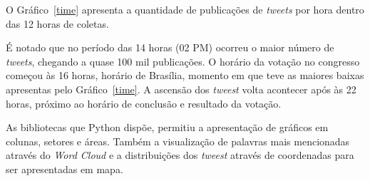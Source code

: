 O Gráfico~\ref{time} apresenta a quantidade de publicações de \textit{tweets} por hora dentro das 12 horas de coletas.

É notado que no período das 14 horas (02 PM) ocorreu o maior número de \textit{tweets}, chegando a quase 100 mil publicações. O horário da votação no congresso começou às 16 horas, horário de Brasília, momento em que teve as maiores baixas apresentas pelo Gráfico~\ref{time}. A ascensão dos \textit{tweest} volta acontecer após às 22 horas, próximo ao horário de conclusão e resultado da votação.

As bibliotecas que Python dispõe, permitiu a apresentação de gráficos em colunas, setores e áreas. Também a visualização de palavras mais mencionadas através do \textit{Word Cloud} e a distribuições dos \textit{tweest} através de coordenadas para ser apresentadas em mapa.







